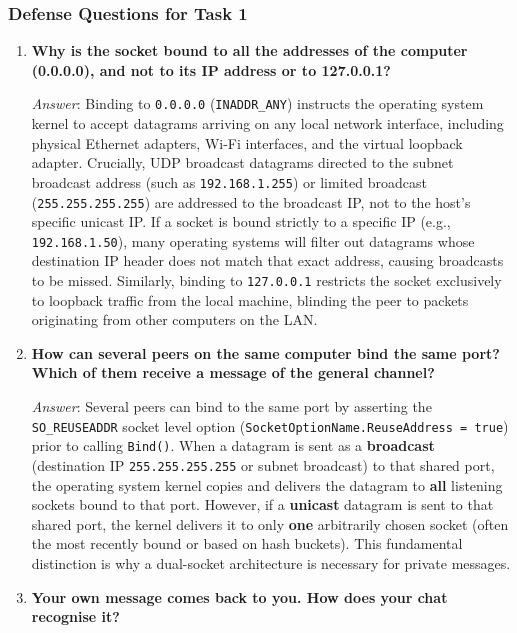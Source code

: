 \documentclass[11pt,a4paper]{article}
\begin{document}
\subsubsection{Defense Questions for Task 1}
\begin{enumerate}[label=\textbf{Q\arabic*.}, leftmargin=*]
    \item \textbf{Why is the socket bound to all the addresses of the computer (0.0.0.0), and not to its IP address or to 127.0.0.1?}
    
    \textit{Answer}: Binding to \texttt{0.0.0.0} (\texttt{INADDR\_ANY}) instructs the operating system kernel to accept datagrams arriving on any local network interface, including physical Ethernet adapters, Wi-Fi interfaces, and the virtual loopback adapter. Crucially, UDP broadcast datagrams directed to the subnet broadcast address (such as \texttt{192.168.1.255}) or limited broadcast (\texttt{255.255.255.255}) are addressed to the broadcast IP, not to the host's specific unicast IP. If a socket is bound strictly to a specific IP (e.g., \texttt{192.168.1.50}), many operating systems will filter out datagrams whose destination IP header does not match that exact address, causing broadcasts to be missed. Similarly, binding to \texttt{127.0.0.1} restricts the socket exclusively to loopback traffic from the local machine, blinding the peer to packets originating from other computers on the LAN.

    \item \textbf{How can several peers on the same computer bind the same port? Which of them receive a message of the general channel?}
    
    \textit{Answer}: Several peers can bind to the same port by asserting the \texttt{SO\_REUSEADDR} socket level option (\texttt{SocketOptionName.ReuseAddress = true}) prior to calling \texttt{Bind()}. When a datagram is sent as a \textbf{broadcast} (destination IP \texttt{255.255.255.255} or subnet broadcast) to that shared port, the operating system kernel copies and delivers the datagram to \textbf{all} listening sockets bound to that port. However, if a \textbf{unicast} datagram is sent to that shared port, the kernel delivers it to only \textbf{one} arbitrarily chosen socket (often the most recently bound or based on hash buckets). This fundamental distinction is why a dual-socket architecture is necessary for private messages.

    \item \textbf{Your own message comes back to you. How does your chat recognise it?}
    

\end{enumerate}
\end{document}
